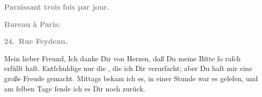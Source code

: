 \pstart
           \begin{otherlanguage}{french}\textcolor{gray}{\textbf{\textbf{Paraissant trois fois par jour.}}}\end{otherlanguage}\pend
           
\pstart
           \begin{otherlanguage}{french}\textcolor{gray}{\textbf{\textbf{Bureau à Paris:}}}\end{otherlanguage}\pend
           
\pstart
           \begin{otherlanguage}{french}\textcolor{gray}{\textbf{\textbf{24. Rue Feydeau.}}}\end{otherlanguage}\pend
           
\pstart\center{}Mein lieber Freund,\pend\vspace{0.5em}
\pstart
           Ich danke Dir von Herzen, daß Du meine Bitte ſo raſch erfüllt haſt. Entſchuldige nur
               die \label{K_L02726-1v}\label{K_L02726-1}, die
               ich Dir verurſacht; aber Du haſt mir eine große Freude gemacht. Mittags
               bekam ich es, in einer Stunde
               war es geleſen, und am ſelben Tage ſende ich es Dir
               noch zurück.\pend
           
